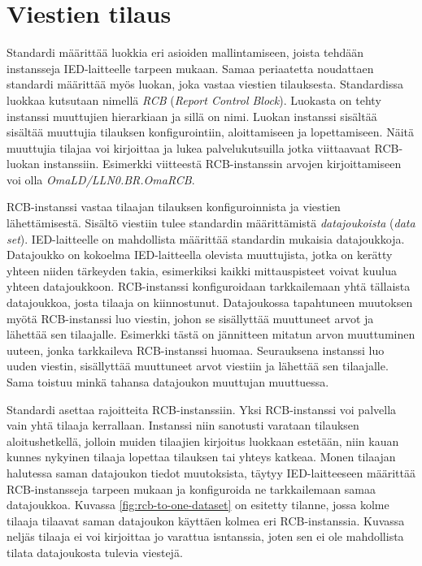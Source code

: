 \section{Viestien tilaus}
Standardi määrittää luokkia eri asioiden mallintamiseen, joista tehdään instansseja IED-laitteelle tarpeen mukaan. Samaa periaatetta noudattaen standardi määrittää myös luokan, joka vastaa viestien tilauksesta. Standardissa luokkaa kutsutaan nimellä \emph{RCB} (\emph{Report Control Block}). Luokasta on tehty instanssi muuttujien hierarkiaan ja sillä on nimi. Luokan instanssi sisältää sisältää muuttujia tilauksen konfigurointiin, aloittamiseen ja lopettamiseen. Näitä muuttujia tilajaa voi kirjoittaa ja lukea palvelukutsuilla jotka viittaavaat RCB-luokan instanssiin. Esimerkki viitteestä RCB-instanssin arvojen kirjoittamiseen voi olla \emph{OmaLD/LLN0.BR.OmaRCB}. \mbox{\cite[s.~95--97]{IEC61850-7-2}}

RCB-instanssi vastaa tilaajan tilauksen konfiguroinnista ja viestien lähettämisestä. Sisältö viestiin tulee standardin määrittämistä \emph{datajoukoista} (\emph{data set}). IED-laitteelle on mahdollista määrittää standardin mukaisia datajoukkoja. Datajoukko on kokoelma IED-laitteella olevista muuttujista, jotka on kerätty yhteen niiden tärkeyden takia, esimerkiksi kaikki mittauspisteet voivat kuulua yhteen datajoukkoon. RCB-instanssi konfiguroidaan tarkkailemaan yhtä tällaista datajoukkoa, josta tilaaja on kiinnostunut. Datajoukossa tapahtuneen muutoksen myötä RCB-instanssi luo viestin, johon se sisällyttää muuttuneet arvot ja lähettää sen tilaajalle. Esimerkki tästä on jännitteen mitatun arvon muuttuminen uuteen, jonka tarkkaileva RCB-instanssi huomaa. Seurauksena instanssi luo uuden viestin, sisällyttää muuttuneet arvot viestiin ja lähettää sen tilaajalle. Sama toistuu minkä tahansa datajoukon muuttujan muuttuessa. \mbox{\cite[s.~93]{IEC61850-7-2}}

Standardi asettaa rajoitteita RCB-instanssiin. Yksi RCB-instanssi voi palvella vain yhtä tilaaja kerrallaan. Instanssi niin sanotusti varataan tilauksen aloitushetkellä, jolloin muiden tilaajien kirjoitus luokkaan estetään, niin kauan kunnes nykyinen tilaaja lopettaa tilauksen tai yhteys katkeaa. Monen tilaajan halutessa saman datajoukon tiedot muutoksista, täytyy IED-laitteeseen määrittää RCB-instansseja tarpeen mukaan ja konfiguroida ne tarkkailemaan samaa datajoukkoa. Kuvassa \ref{fig:rcb-to-one-dataset} on esitetty tilanne, jossa kolme tilaaja tilaavat saman datajoukon käyttäen kolmea eri RCB-instanssia. Kuvassa neljäs tilaaja ei voi kirjoittaa jo varattua isntanssia, joten sen ei ole mahdollista tilata datajoukosta tulevia viestejä. \mbox{\cite[s.~93]{IEC61850-7-2}}

